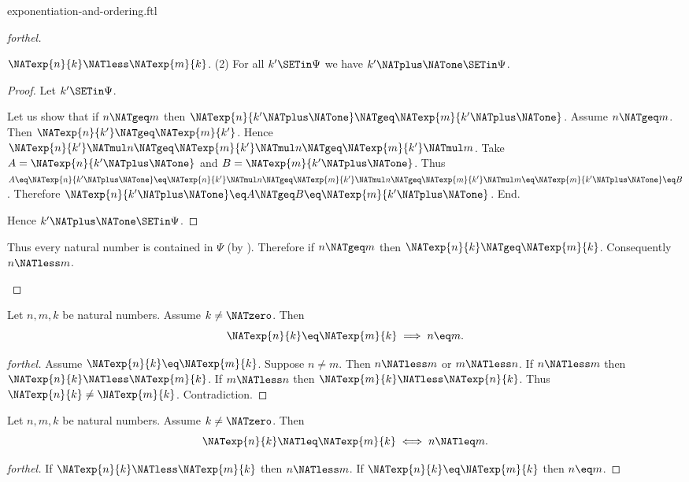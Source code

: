 \documentclass{stex}
\begin{document}
\begin{smodule}{exponentiation-and-ordering.ftl}
\begin{proof}[forthel]
\begin{case}{$\NATexp{n}{k} \NATless \NATexp{m}{k}$.}
    (2) For all $k' \SETin \Psi$ we have $k' \NATplus \NATone \SETin \Psi$.
    \begin{proof}
      Let $k' \SETin \Psi$.

      Let us show that if $n \NATgeq m$ then $\NATexp{n}{k' \NATplus \NATone} \NATgeq \NATexp{m}{k' \NATplus \NATone}$.
        Assume $n \NATgeq m$.
        Then $\NATexp{n}{k'} \NATgeq \NATexp{m}{k'}$.
        Hence $\NATexp{n}{k'} \NATmul n \NATgeq \NATexp{m}{k'} \NATmul n \NATgeq \NATexp{m}{k'} \NATmul m$.
        Take $A = \NATexp{n}{k' \NATplus \NATone}$ and $B = \NATexp{m}{k' \NATplus \NATone}$. %
        Thus $A
          \eq \NATexp{n}{k' \NATplus \NATone}
          \eq \NATexp{n}{k'} \NATmul n
          \NATgeq \NATexp{m}{k'} \NATmul n
          \NATgeq \NATexp{m}{k'} \NATmul m
          \eq \NATexp{m}{k' \NATplus \NATone}
          \eq B$.
        Therefore $\NATexp{n}{k' \NATplus \NATone} \eq A \NATgeq B \eq \NATexp{m}{k' \NATplus \NATone}$.
      End.

      Hence $k' \NATplus \NATone \SETin \Psi$.
    \end{proof}

    Thus every natural number is contained in $\Psi$ (by ).
    Therefore if $n \NATgeq m$ then $\NATexp{n}{k} \NATgeq \NATexp{m}{k}$.
    Consequently $n \NATless m$.
  \end{case}
\end{proof}

\begin{corollary}[forthel,id=ARITHMETIC_09_2797602550579200]
  Let $n, m, k$ be natural numbers.
  Assume $k \neq \NATzero$.
  Then \[ \NATexp{n}{k} \eq \NATexp{m}{k} \implies n \eq m. \]
\end{corollary}
\begin{proof}[forthel]
  Assume $\NATexp{n}{k} \eq \NATexp{m}{k}$.
  Suppose $n \neq m$.
  Then $n \NATless m$ or $m \NATless n$.
  If $n \NATless m$ then $\NATexp{n}{k} \NATless \NATexp{m}{k}$.
  If $m \NATless n$ then $\NATexp{m}{k} \NATless \NATexp{n}{k}$.
  Thus $\NATexp{n}{k} \neq \NATexp{m}{k}$.
  Contradiction.
\end{proof}

\begin{corollary}[forthel,id=ARITHMETIC_09_6875081963732992]
  Let $n, m, k$ be natural numbers.
  Assume $k \neq \NATzero$.
  Then \[ \NATexp{n}{k} \NATleq \NATexp{m}{k} \iff n \NATleq m. \]
\end{corollary}
\begin{proof}[forthel]
  If $\NATexp{n}{k} \NATless \NATexp{m}{k}$ then $n \NATless m$.
  If $\NATexp{n}{k} \eq \NATexp{m}{k}$ then $n \eq m$.


\end{proof}
\end{smodule}
\end{document}
